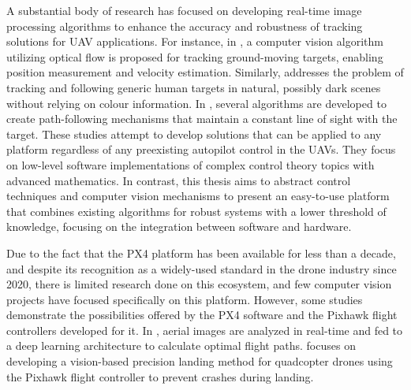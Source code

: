 A substantial body of research has focused on developing real-time image processing algorithms to enhance the accuracy and robustness of tracking solutions for UAV applications. For instance, in \cite{gomez-balderas2012}, a computer vision algorithm utilizing optical flow is proposed for tracking ground-moving targets, enabling position measurement and velocity estimation. Similarly, \cite{bevilacqua2016} addresses the problem of tracking and following generic human targets in natural, possibly dark scenes without relying on colour information. In \cite{rysdyk2003}, several algorithms are developed to create path-following mechanisms that maintain a constant line of sight with the target. These studies attempt to develop solutions that can be applied to any platform regardless of any preexisting autopilot control in the UAVs.
They focus on low-level software implementations of complex control theory topics with advanced mathematics.
In contrast, this thesis aims to abstract control techniques and computer vision mechanisms to present an easy-to-use platform that combines existing algorithms for robust systems with a lower threshold of knowledge, focusing on the integration between software and hardware.

Due to the fact that the PX4 platform has been available for less than a decade, and despite its recognition as a widely-used standard in the drone industry since 2020, there is limited research done on this ecosystem, and few computer vision projects have focused specifically on this platform. However, some studies demonstrate the possibilities offered by the PX4 software and the Pixhawk flight controllers developed for it. In \cite{sizkouhi2022}, aerial images are analyzed in real-time and fed to a deep learning architecture to calculate optimal flight paths. \cite{naufal2022} focuses on developing a vision-based precision landing method for quadcopter drones using the Pixhawk flight controller to prevent crashes during landing.

